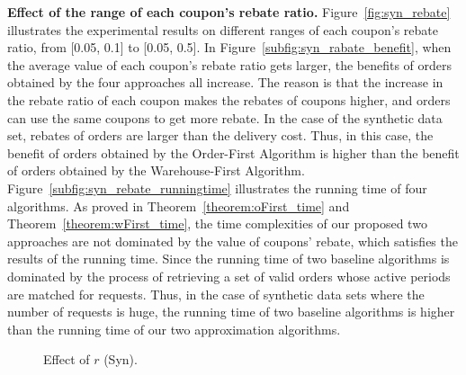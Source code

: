 \textbf{Effect of the range of each coupon's rebate ratio.} Figure~\ref{fig:syn_rebate} illustrates the experimental results on different ranges of each coupon's rebate ratio, from [0.05, 0.1] to [0.05, 0.5]. In Figure~\ref{subfig:syn_rabate_benefit}, when the average value of each coupon's rebate ratio gets larger, the benefits of orders obtained by the four approaches all increase. The reason is that the increase in the rebate ratio of each coupon makes the rebates of coupons higher, and orders can use the same coupons to get more rebate. In the case of the synthetic data set, rebates of orders are larger than the delivery cost. Thus, in this case, the benefit of orders obtained by the Order-First Algorithm is higher than the benefit of orders obtained by the Warehouse-First Algorithm. Figure~\ref{subfig:syn_rebate_runningtime} illustrates the running time of four algorithms. As proved in Theorem~\ref{theorem:oFirst_time} and Theorem~\ref{theorem:wFirst_time}, the time complexities of our proposed two approaches are not dominated by the value of coupons' rebate, which satisfies the results of the running time. Since the running time of two baseline algorithms is dominated by the process of retrieving a set of valid orders whose active periods are matched for requests. Thus, in the case of synthetic data sets where the number of requests is huge, the running time of two baseline algorithms is higher than the running time of our two approximation algorithms.


\begin{figure}[t!]\centering \vspace{-2ex}
	\subfigcapskip=-5pt
	\vspace{-2ex}
	\addtocounter{subfigure}{-1}
	\figureCaptionMargin
	\vspace{1ex}
	\caption{\small Effect of $r$ (Syn).}\figureBelowMargin
	\label{fig:syn_r}\vspace{-1ex}
\end{figure}

